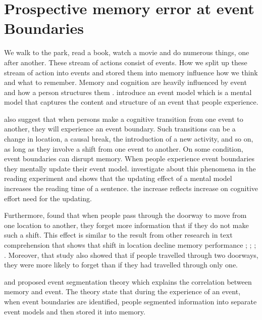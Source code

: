 \section{Prospective memory error at event Boundaries}

We walk to the park, read a book, watch a movie and do numerous things, one after another. These stream of actions consist of events. How we split up these stream of action into events and stored them into memory influence how we think and what to remember. Memory and cognition are heavily influenced by event and how a person structures them \citep{Radvansky2012}. \cite{Radvansky2011} introduce an event model which is a mental model that captures the content and structure of an event that people experience.

\cite{Radvansky2012} also suggest that when persons make a cognitive transition from one event to another, they will experience an event boundary. Such transitions can be a change in location, a causal break, the introduction of a new activity, and so on, as long as they involve a shift from one event to another.  On some condition, event boundaries can disrupt memory. When people experience event boundaries they mentally update their event model. \cite{Radvansky2010} investigate about this phenomena in the reading experiment and shows that the updating effect of a mental model increases the reading time of a sentence. the increase reflects increase on cognitive effort need for the updating.



Furthermore, \cite{Radvansky2010} found that when people pass through the doorway to move from
one location to another, they forget more information that if they do not make such a shift. This
effect is similar to the result from other research in text comprehension that shows that shift
in location decline memory performance \citep{Curiel2002}; \citep{Haenggi1995}; \citep{Radvansky2010}; \citep{Radvansky2003}.
Moreover, that study also showed that if people travelled through two doorways, they were more
likely to forget than if they had travelled through only one.

\cite{Kurby2008} and \cite{Swallow2009} proposed event segmentation theory
which explains the correlation between memory and event. The theory state that during the experience of an event, when event boundaries are identified, people segmented information into separate event models and then stored it into memory.

